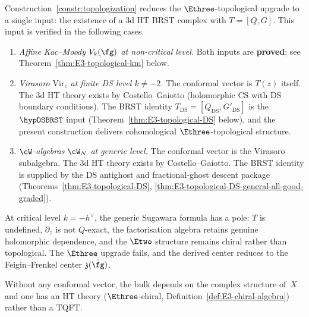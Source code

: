 \begin{remark}
\label{rem:topologization-scope-3d}
Construction~\ref{constr:topologization} reduces the
$\Ethree$-topological upgrade to a single input: the
existence of a $3$d HT BRST complex with $T = [Q, G]$.
This input is verified in the following cases.
\begin{enumerate}[label=\textup{(\roman*)}]
\item \emph{Affine Kac--Moody $V_k(\fg)$ at non-critical level.}
 Both inputs are \textbf{proved}; see
 Theorem~\ref{thm:E3-topological-km} below.
\item \emph{Virasoro $\mathrm{Vir}_c$ at finite DS level
$k\ne -2$.}
The conformal vector is $T(z)$ itself.
The $3$d HT theory exists by Costello--Gaiotto
 (holomorphic CS with DS boundary conditions).
 The BRST identity
 $T_{\mathrm{DS}} = [Q_{\mathrm{DS}}, G'_{\mathrm{DS}}]$ is the
 \(\hypDSBRST\) input
 \textup{(}Theorem~\textup{\ref{thm:E3-topological-DS}}
 below\textup{)}, and the present construction delivers
 cohomological $\Ethree$-topological structure.
\item \emph{$\cW$-algebras $\cW_N$ at generic level.}
 The conformal vector is the Virasoro subalgebra.
 The $3$d HT theory exists by Costello--Gaiotto.
 The BRST identity is supplied by the DS antighost and
 fractional-ghost descent package
 \textup{(}Theorems~\textup{\ref{thm:E3-topological-DS}},
 \ref{thm:E3-topological-DS-general-all-good-graded}\textup{)}.
\end{enumerate}
At critical level $k = -h^\vee$, the generic Sugawara formula has a
pole: $T$ is undefined, $\partial_z$ is not $Q$-exact, the
factorisation algebra retains genuine holomorphic dependence,
and the $\Etwo$ structure remains chiral rather than
topological. The $\Ethree$ upgrade fails, and the derived
center reduces to the Feigin--Frenkel center
$\mathfrak{z}(\hat{\fg})$.

Without any conformal vector, the bulk depends on the complex
structure of~$X$ and one has an HT theory
\textup{(}$\Ethree$-chiral,
Definition~\textup{\ref{def:E3-chiral-algebra}}\textup{)}
rather than a TQFT.
\end{remark}

